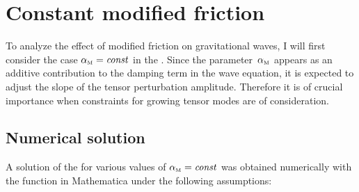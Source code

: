 \section{Constant modified friction}\label{sec:param_friction_const}

To analyze the effect of modified friction on gravitational waves, I will first consider the case \({\alpha_{\textnormal{\tiny{M}}}}=\textnormal{\textit{const}}\) in the . Since the parameter~\({\alpha_{\textnormal{\tiny{M}}}}\) appears as an additive contribution to the damping term in the wave equation, it is expected to adjust the slope of the tensor perturbation amplitude. Therefore it is of crucial importance when constraints for growing tensor modes are of consideration.


\subsection{Numerical solution}

A solution of the  for various values of \({\alpha_{\textnormal{\tiny{M}}}}=\textnormal{\textit{const}}\) was obtained numerically with the  function in Mathematica under the following assumptions:


